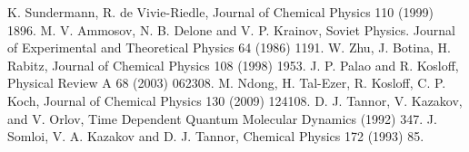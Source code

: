 \documentclass[]{interact}
\theoremstyle{plain}%
\theoremstyle{definition}
\theoremstyle{remark}
\begin{document}
\begin{thebibliography}{99}
K. Sundermann, R. de Vivie-Riedle, Journal of Chemical Physics 110 (1999) 1896.
M. V. Ammosov, N. B. Delone and V. P. Krainov, Soviet Physics. Journal of 
Experimental and Theoretical Physics 64 (1986) 1191.
W. Zhu, J. Botina, H. Rabitz, Journal of Chemical Physics 108 (1998) 1953.
J. P. Palao and R. Kosloff, Physical Review A 68 (2003) 062308.
M. Ndong, H. Tal-Ezer, R. Kosloff, C. P. Koch, Journal of Chemical Physics 130 
(2009) 124108.
D. J. Tannor, V. Kazakov, and V. Orlov, Time Dependent Quantum Molecular 
Dynamics (1992) 347.
J. Somloi, V. A. Kazakov and D. J. Tannor, Chemical Physics 172 (1993) 85.

\end{thebibliography}
\end{document}
